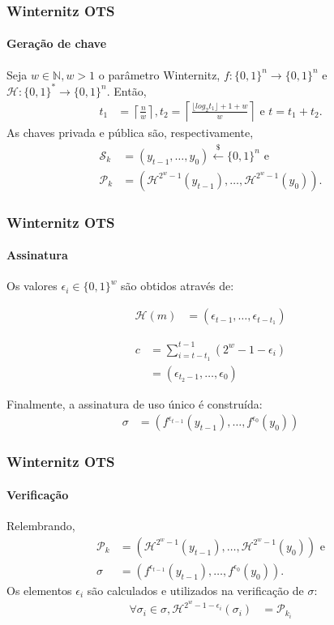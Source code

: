 \documentclass[12pt]{beamer}
\newcommand{\pk}{\mathcal{P}_k}
\newcommand{\sk}{\mathcal{S}_k}
\newcommand{\hash}[2][]{\mathcal{H}^{#1}(#2)}
\begin{document}
\begin{frame}
  \frametitle{Winternitz OTS}
  \framesubtitle{Geração de chave}
  Seja $w \in \mathbb{N}, w > 1$ o parâmetro Winternitz,
  $f : \{0, 1\}^{n} \longrightarrow \{0, 1\}^{n}$
  e $\mathcal{H} : \{0, 1\}^{*} \longrightarrow \{0, 1\}^{n}$. Então,
   \begin{align*}
       t_1 &= \left\lceil \frac{n}{w} \right\rceil, t_2 = \left\lceil
       \frac{\lfloor log_2 t_1 \rfloor + 1 + w}{w} \right\rceil \text{ e } t = t_1 + t_2.
   \end{align*}
   As chaves privada e pública são, respectivamente,
   \begin{align*}
      \sk{} &= (y_{t - 1}, \dots, y_{0})
        \stackrel{\$}{\longleftarrow} \{0,1\}^n \text{ e}\\
      \pk{} &= (\hash[2^w - 1]{y_{t - 1}}, \dots, \hash[2^w - 1]{y_0}).
   \end{align*}
\end{frame}

\begin{frame}
  \frametitle{Winternitz OTS}
  \framesubtitle{Assinatura}
  Os valores $\epsilon_i \in \{0, 1\}^w$ são obtidos através de:
  
  \begin{minipage}{.45\linewidth}
  \begin{align*}
    \mathcal{H}(m) &= (\epsilon_{t - 1}, \dots, \epsilon_{t - t_1})
  \end{align*}
  \end{minipage}
  \begin{minipage}{.45\linewidth}
  \begin{align*}
    c &= \sum_{i = t - t_1}^{t - 1} (2^w - 1 - \epsilon_i) \\
      &= (\epsilon_{t_2 - 1}, \dots, \epsilon_{0})
  \end{align*}
  \end{minipage}
  \vspace{4mm}
  
  Finalmente, a assinatura de uso único é construída:
  \begin{align*}
    \sigma &= (f^{\epsilon_{t - 1}}(y_{t - 1}), \dots, f^{\epsilon_0}(y_0))
  \end{align*}
\end{frame}

\begin{frame}
  \frametitle{Winternitz OTS}
  \framesubtitle{Verificação}
  Relembrando,
  \begin{align*}
    \pk{} &= (\hash[2^w - 1]{y_{t - 1}}, \dots, \hash[2^w - 1]{y_0}) \text{ e} \\
    \sigma &= (f^{\epsilon_{t - 1}}(y_{t - 1}), \dots, f^{\epsilon_0}(y_0)).
  \end{align*}
  Os elementos $\epsilon_i$ são calculados e utilizados na verificação de $\sigma$:
  \begin{align*}
    \forall \sigma_i \in \sigma, \hash[2^w - 1 - \epsilon_{i}]{\sigma_i} &= \mathcal{P}_{k_i}
  \end{align*}
\end{frame}
\end{document}
